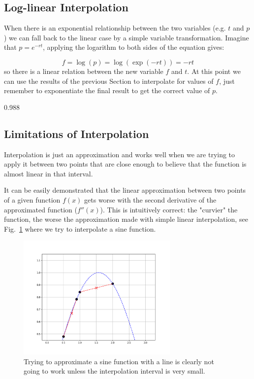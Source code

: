 \subsection{Log-linear Interpolation}
\label{log-linear-interpolation}

When there is an exponential relationship between the two variables (e.g. $t$ and $p$) we can fall back to the linear case by a simple variable transformation. 
Imagine that $p=e^{-rt}$, applying the logarithm to both sides of the equation gives:

\begin{equation}
f = \log(p) = \log(\exp(-rt)) = -rt
\end{equation}
so there is a linear relation between the new variable $f$ and $t$. At this point we can use the results of the previous Section to interpolate for values of 
$f$, just remember to exponentiate the final result to get the correct value of $p$.


\begin{ioutput}
0.988
\end{ioutput}

\subsection{Limitations of Interpolation}
Interpolation is just an approximation and works well when we are trying to apply it between two points that are close enough to believe that the function is 
almost linear in that interval.

It can be easily demonstrated that the linear approximation between two points of a given function $f(x)$ gets worse with the second derivative of the approximated function ($f''(x)$). This is intuitively correct: the "curvier" the function, the worse the approximation made with simple linear interpolation, see Fig.~\ref{fig:sine_interp} where we try to interpolate a sine function.

\begin{figure}
  \centering
  \includegraphics[width=0.7\textwidth]{figures/wrong_interp.png}
  \caption{Trying to approximate a sine function with a line is clearly not going to work unless the interpolation interval is very small.}
  \label{fig:sine_interp}
\end{figure}

